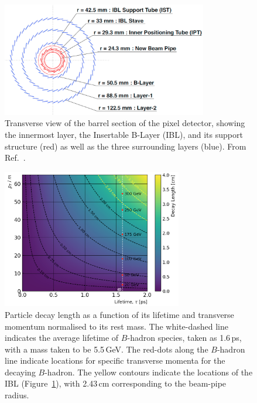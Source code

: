 \begin{figure}[!htb]
    \begin{center}
        \includegraphics[width=0.8\textwidth]{figures/chapter2/inner_detector/pixel_detector_trans}
        \caption{
            Transverse view of the barrel section of the pixel detector, showing
            the innermost layer, the Insertable B-Layer (IBL), and its support structure (red) as well as the
            three surrounding layers (blue). From Ref.~\cite{Backhaus:2016ctq}.
        }
        \label{fig:pixel_detector_trans}
    \end{center}
\end{figure}

\begin{figure}[!htb]
    \begin{center}
        \includegraphics[width=0.7\textwidth]{figures/bhadron_decay_length_ibl}
        \caption{
            Particle decay length as a function of its lifetime and transverse momentum normalised
            to its rest mass.
            The white-dashed line indicates the average lifetime of $B$-hadron species, taken
            as 1.6\,ps, with a mass taken to be 5.5\,GeV.
            The red-dots along the $B$-hadron line indicate locations for specific transverse momenta
            for the decaying $B$-hadron.
            The yellow contours indicate the locations of the IBL (Figure~\ref{fig:pixel_detector_trans}),
            with 2.43\,cm corresponding to the beam-pipe radius.
            {\color{red}{Perhaps move this plot elsewhere?}}
            {\color{red}{Add references to PDG}}
        }
        \label{fig:bhadron_decay_length}
    \end{center}
\end{figure}

